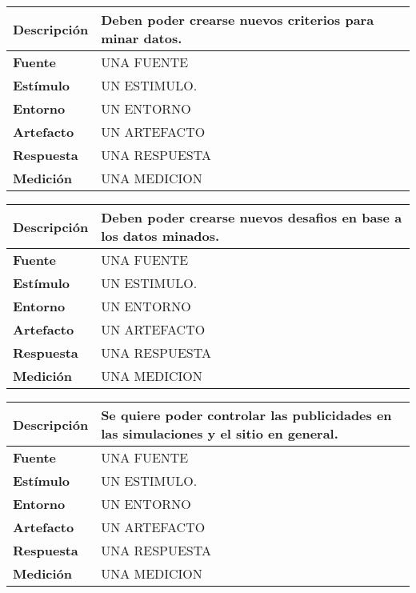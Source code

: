 \begin{center}
  \begin{tabular}{| l | p{10cm} | }
    \hline
  \textbf{Descripción} & Deben poder crearse nuevos criterios para minar datos.\\  \hline
  \textbf{Fuente} & UNA FUENTE\\  \hline
  \textbf{Estímulo} & UN ESTIMULO.\\  \hline
  \textbf{Entorno} & UN ENTORNO\\  \hline
  \textbf{Artefacto} & UN ARTEFACTO\\  \hline
  \textbf{Respuesta} & UNA RESPUESTA\\  \hline
  \textbf{Medición} & UNA MEDICION\\  \hline
  \end{tabular}
\end{center} 

\begin{center}
  \begin{tabular}{| l | p{10cm} | }
    \hline
  \textbf{Descripción} & Deben poder crearse nuevos desafios en base a los datos minados.\\  \hline
  \textbf{Fuente} & UNA FUENTE\\  \hline
  \textbf{Estímulo} & UN ESTIMULO.\\  \hline
  \textbf{Entorno} & UN ENTORNO\\  \hline
  \textbf{Artefacto} & UN ARTEFACTO\\  \hline
  \textbf{Respuesta} & UNA RESPUESTA\\  \hline
  \textbf{Medición} & UNA MEDICION\\  \hline
  \end{tabular}
\end{center} 

\begin{center}
  \begin{tabular}{| l | p{10cm} | }
    \hline
  \textbf{Descripción} & Se quiere poder controlar las publicidades en las simulaciones y el sitio en general.\\  \hline
  \textbf{Fuente} & UNA FUENTE\\  \hline
  \textbf{Estímulo} & UN ESTIMULO.\\  \hline
  \textbf{Entorno} & UN ENTORNO\\  \hline
  \textbf{Artefacto} & UN ARTEFACTO\\  \hline
  \textbf{Respuesta} & UNA RESPUESTA\\  \hline
  \textbf{Medición} & UNA MEDICION\\  \hline
  \end{tabular}
\end{center} 

